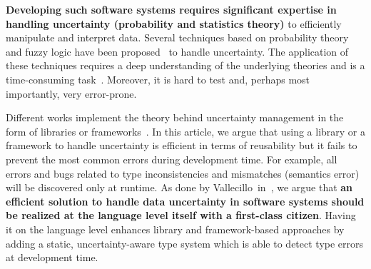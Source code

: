 \textbf{Developing such software systems requires significant expertise in handling uncertainty (probability and statistics theory)} to efficiently manipulate and interpret data. 
Several techniques based on probability theory and fuzzy logic have been proposed~\cite{zadeh1996fuzzy,metrology2008evaluation,shafer1992dempster} to handle uncertainty. 
The application of these techniques requires a deep understanding of the underlying theories and is a time-consuming task~\cite{DBLP:conf/quatic/VallecilloMO16}.
Moreover, it is hard to test and, perhaps most importantly, very error-prone.

Different works implement the theory behind uncertainty management in the form of libraries or frameworks~\cite{url:InferNET18, baudin2017openturns}.  
In this article, we argue that using a library or a framework to handle uncertainty is efficient in terms of reusability but it fails to prevent the most common errors during development time. 
For example, all errors and bugs related to type inconsistencies and mismatches (semantics error) will be discovered only at runtime.
As done by Vallecillo~\etal in~\cite{DBLP:conf/quatic/VallecilloMO16}, we argue that \textbf{an efficient solution to handle data uncertainty in software systems should be realized at the language level itself with a first-class citizen}. 
Having it on the language level enhances library and framework-based approaches by adding a static, uncertainty-aware type system which is able to detect type errors at development time.


